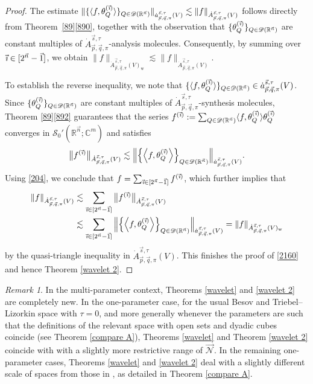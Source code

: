 \documentclass[11pt, reqno]{amsart}
\theoremstyle{definition}
\theoremstyle{remark}
\newtheorem{remark}[theorem]{Remark}
\numberwithin{equation}{section}
\newcommand{\vi}{\vec{\textit{\i}}}
\newcommand{\vn}{\vec n}
\begin{document}
\begin{proof}
The estimate
$\|\{\langle f,\theta^{(\vi)}_Q\rangle\}_{Q\in\mathscr{D}(\mathbb R^{\vec n})}\|_{\dot a^{\vec s,\tau}_{\vec p,\vec q,\pi}(V)}
\lesssim\| f\|_{\dot A^{\vec s,\tau}_{\vec p,\vec q,\pi}(V)}$
follows directly from Theorem~\ref{89}\eqref{890}, together with the observation that
$\{\theta^{(\vi)}_Q\}_{Q\in\mathscr{D}(\mathbb R^{\vec n})}$ are
constant multiples of
$\dot A^{\vec s,\tau}_{\vec p,\vec q,\pi}$-analysis molecules.
Consequently, by summing over $\vi\in[2^{\vn}-\vec1]$, we obtain
$\|f\|_{\dot A^{\vec s,\tau}_{\vec p,\vec q,\pi}(V)_\mathrm{w}}
\lesssim \| f\|_{\dot A^{\vec s,\tau}_{\vec p,\vec q,\pi}(V)}$.

To establish the reverse inequality, we note that $\{\langle f,\theta^{(\vi)}_Q\rangle\}_{Q\in\mathscr{D}(\mathbb R^{\vec n})}
\in\dot a^{\vec s,\tau}_{\vec p,\vec q,\pi}(V)$. Since
$\{\theta^{(\vi)}_Q\}_{Q\in\mathscr{D}(\mathbb R^{\vec n})}$
are constant multiples of $\dot A^{\vec s,\tau}_{\vec p,\vec q,\pi}$-synthesis molecules,
Theorem \ref{89}\eqref{892} guarantees that the series
$f^{(\vi)}:=\sum_{Q\in\mathscr{D}(\mathbb R^{\vec n})}
\langle f,\theta^{(\vi)}_Q\rangle \theta^{(\vi)}_Q$
converges in $\mathscr S_0'(\mathbb R^{\vec n};\mathbb C^m)$ and satisfies
\begin{equation*}
\big\|f^{(\vi)}\big\|_{\dot A^{\vec s,\tau}_{\vec p,\vec q,\pi}(V)}
\lesssim \Big\|\Big\{\Big\langle f,\theta^{(\vi)}_Q \Big\rangle\Big\}_{Q\in\mathscr{D}(\mathbb R^{\vec n})}\Big\|_{\dot a^{\vec s,\tau}_{\vec p,\vec q,\pi}(V)}.
\end{equation*}
Using \eqref{204}, we conclude that $f=\sum_{\vi\in[2^{\vn}-\vec1]}  f^{(\vi)}$, which further implies that
\begin{align*}
\| f\|_{\dot A^{\vec s,\tau}_{\vec p,\vec q,\pi}(V)}
&\lesssim \sum_{\vi\in[2^{\vn}-\vec1]}  \big\|f^{(\vi)}\big\|_{\dot A^{\vec s,\tau}_{\vec p,\vec q,\pi}(V)}\\
&\lesssim \sum_{\vi\in[2^{\vn}-\vec1]} \Big\|\Big\{\Big\langle f,\theta^{(\vi)}_Q \Big\rangle\Big\}_{Q\in\mathscr{D}(\mathbb R^{\vec n})}\Big\|_{\dot a^{\vec s,\tau}_{\vec p,\vec q,\pi}(V)}
=\| f\|_{\dot A^{\vec s,\tau}_{\vec p,\vec q,\pi}(V)_{\mathrm w}}
\end{align*}
by the quasi-triangle inequality in $\dot A^{\vec s,\tau}_{\vec p,\vec q,\pi}(V)$.
This finishes the proof of \eqref{2160} and hence Theorem \ref{wavelet 2}.
\end{proof}

\begin{remark}
In the multi-parameter context, Theorems \ref{wavelet} and \ref{wavelet 2} are completely new.
In the one-parameter case, for the usual Besov and Triebel--Lizorkin space with $\tau=0$, and more generally whenever the parameters are such that the definitions of the relevant space with open sets and dyadic cubes coincide (see Theorem \ref{compare A}), Theorems \ref{wavelet} and Theorem \ref{wavelet 2} coincide with \cite[Theorems 4.3 and 4.10]{BHYY:1c} with a slightly more restrictive range of $\vec{\mathscr N}$. In the remaining one-parameter cases, Theorems \ref{wavelet} and \ref{wavelet 2} deal with a slightly different scale of spaces from those in \cite{BHYY:1c}, as detailed in Theorem \ref{compare A}.
\end{remark}
\end{document}
